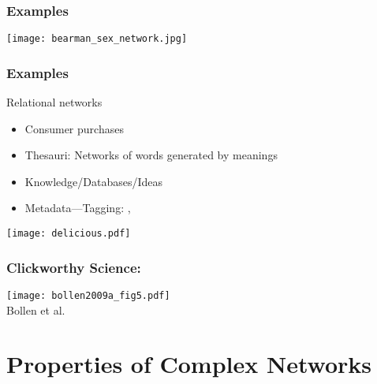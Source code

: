 \begin{frame}
  \frametitle{Examples}

    \texttt{[image: bearman\_sex\_network.jpg]}\\

\end{frame}

\begin{frame}
  \frametitle{Examples}

  \begin{block}{Relational networks}
    \begin{itemize}
    \item<1-> Consumer purchases \\
    \item<3-> Thesauri: Networks of words generated by meanings
    \item<4-> Knowledge/Databases/Ideas
    \item<5-> Metadata---Tagging:
      ,
    \end{itemize}
  \end{block}
  \begin{overprint}
    \texttt{[image: delicious.pdf]}
  \end{overprint}

\end{frame}

\begin{frame}
  \frametitle{Clickworthy Science:}

    \texttt{[image: bollen2009a\_fig5.pdf]}\\
    {\small Bollen et al.\cite{bollen2009a}}

\end{frame}


\section{Properties of Complex Networks}

